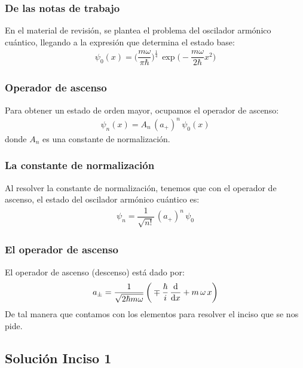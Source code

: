 \documentclass[12pt]{beamer}
\begin{document}
\begin{frame}
\frametitle{De las notas de trabajo}
En el material de revisión, se plantea el problema del oscilador armónico cuántico, llegando a la expresión que determina el estado base:
\begin{align*}
\psi_{0} (x) = \bigg( \dfrac{m \omega}{\pi \hbar} \bigg)^{\frac{1}{4}} \, \exp\bigg(- \dfrac{m \omega}{2 \hbar} x^{2} \bigg)
\end{align*}
\end{frame}
\begin{frame}
\frametitle{Operador de ascenso}
Para obtener un estado de orden mayor, ocupamos el operador de ascenso:
\pause
\begin{align*}
\psi_{n} (x) = A_{n} \, (a_{+})^{n} \, \psi_{0} (x)
\end{align*}
donde $A_{n}$ es una constante de normalización.
\end{frame}
\begin{frame}
\frametitle{La constante de normalización}
Al resolver la constante de normalización, tenemos que con el operador de ascenso, el estado del oscilador armónico cuántico es:
\pause
\begin{align*}
\psi_{n} = \dfrac{1}{\sqrt{n!}} \, (a_{+})^{n} \, \psi_{0}
\end{align*}
\end{frame}
\begin{frame}
\frametitle{El operador de ascenso}
El operador de ascenso (descenso) está dado por:
\pause
\begin{align*}
a_{\pm} = \dfrac{1}{\sqrt{2 \hbar m \omega}} \, \bigg( \mp \dfrac{\hbar}{i} \, \dv{x} + m \, \omega \, x \bigg)
\end{align*}
\pause
De tal manera que contamos con los elementos para resolver el inciso que se nos pide.
\end{frame}

\subsection{Solución Inciso 1}
\end{document}
